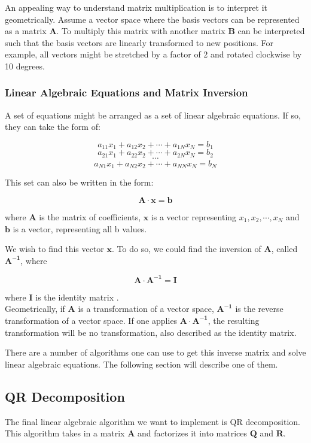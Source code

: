 An appealing way to understand matrix multiplication is to interpret it geometrically. Assume a vector space where the basis vectors can be represented as a matrix $\mathbf{A}$. To multiply this matrix with another matrix $\mathbf{B}$ can be interpreted such that the basis vectors are linearly transformed to new positions. For example, all vectors might be stretched by a factor of 2 and rotated clockwise by 10 degrees. 

\subsubsection{Linear Algebraic Equations and Matrix Inversion}

A set of equations might be arranged as a set of linear algebraic equations. If so, they can take the form of:

\[a_{11}x_1+a_{12}x_2+\cdots+a_{1N}x_N = b_1\]
\[a_{21}x_1+a_{22}x_2+\cdots+a_{2N}x_N = b_2\]
\[\cdots\]
\[a_{N1}x_1+a_{N2}x_2+\cdots+a_{NN}x_N = b_N\]

This set can also be written in the form:

\[\mathbf{A} \cdot \mathbf{x} = \mathbf{b}\]

where $\mathbf{A}$ is the matrix of coefficients, $\mathbf{x}$ is a vector representing $x_1, x_2, \cdots, x_N$ and $\mathbf{b}$ is a vector, representing all b values. 

We wish to find this vector $\mathbf{x}$. To do so, we could find the inversion of $\mathbf{A}$, called $\mathbf{A^{-1}}$, where 

\[\mathbf{A}\cdot\mathbf{A^{-1}} = \mathbf{I}\]

where $\mathbf{I}$ is the identity matrix \cite[Sect. 2.0]{numericalrecipes}.\\

\noindent Geometrically, if $\mathbf{A}$ is a transformation of a vector space, $\mathbf{A^{-1}}$ is the reverse transformation of a vector space. If one applies $\mathbf{A\cdot A^{-1}}$, the resulting transformation will be no transformation, also described as the identity matrix.

There are a number of algorithms one can use to get this inverse matrix and solve linear algebraic equations. The following section will describe one of them. 

\subsection*{QR Decomposition} 
The final linear algebraic algorithm we want to implement is QR decomposition. This algorithm takes in a matrix \(\mathbf{A}\) and factorizes it into matrices \(\mathbf{Q}\) and \(\mathbf{R}\).

